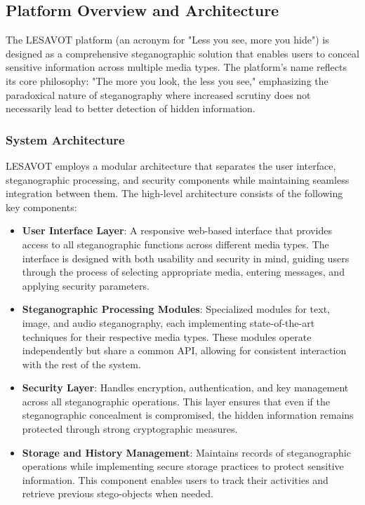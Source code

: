 \documentclass[12pt, a4paper, oneside]{book}
\begin{document}
\subsection{Platform Overview and Architecture}
The LESAVOT platform (an acronym for "Less you see, more you hide") is designed as a comprehensive steganographic solution that enables users to conceal sensitive information across multiple media types. The platform's name reflects its core philosophy: "The more you look, the less you see," emphasizing the paradoxical nature of steganography where increased scrutiny does not necessarily lead to better detection of hidden information.

\subsubsection{System Architecture}
LESAVOT employs a modular architecture that separates the user interface, steganographic processing, and security components while maintaining seamless integration between them. The high-level architecture consists of the following key components:

\begin{itemize}[leftmargin=*]
    \item \textbf{User Interface Layer}: A responsive web-based interface that provides access to all steganographic functions across different media types. The interface is designed with both usability and security in mind, guiding users through the process of selecting appropriate media, entering messages, and applying security parameters.

    \item \textbf{Steganographic Processing Modules}: Specialized modules for text, image, and audio steganography, each implementing state-of-the-art techniques for their respective media types. These modules operate independently but share a common API, allowing for consistent interaction with the rest of the system.

    \item \textbf{Security Layer}: Handles encryption, authentication, and key management across all steganographic operations. This layer ensures that even if the steganographic concealment is compromised, the hidden information remains protected through strong cryptographic measures.

    \item \textbf{Storage and History Management}: Maintains records of steganographic operations while implementing secure storage practices to protect sensitive information. This component enables users to track their activities and retrieve previous stego-objects when needed.
\end{itemize}
\end{document}
